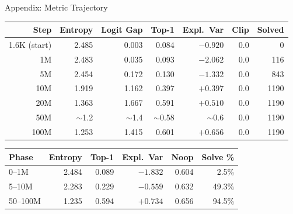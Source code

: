 \documentclass[aspectratio=169,11pt]{beamer}
\begin{document}
\begin{frame}{Appendix: Metric Trajectory}
  \scriptsize
  \begin{center}
  \begin{tabular}{rrrrrrr}
    \toprule
    \textbf{Step} & \textbf{Entropy} & \textbf{Logit Gap} & \textbf{Top-1} & \textbf{Expl.\ Var} & \textbf{Clip} & \textbf{Solved} \\
    \midrule
    1.6K (start) & 2.485 & 0.003 & 0.084 & $-0.920$ & 0.0 & 0 \\
    1M    & 2.483 & 0.035 & 0.093 & $-2.062$ & 0.0 & 116 \\
    5M    & 2.454 & 0.172 & 0.130 & $-1.332$ & 0.0 & 843 \\
    10M   & 1.919 & 1.162 & 0.397 & $+0.397$ & 0.0 & 1190 \\
    20M   & 1.363 & 1.667 & 0.591 & $+0.510$ & 0.0 & 1190 \\
    50M   & $\sim$1.2 & $\sim$1.4 & $\sim$0.58 & $\sim$0.6 & 0.0 & 1190 \\
    100M  & 1.253 & 1.415 & 0.601 & $+0.656$ & 0.0 & 1190 \\
    \bottomrule
  \end{tabular}
  \end{center}

  \bigskip
  \small
  \begin{center}
  \begin{tabular}{lrrrrr}
    \toprule
    \textbf{Phase} & \textbf{Entropy} & \textbf{Top-1} & \textbf{Expl.\ Var} & \textbf{Noop} & \textbf{Solve \%} \\
    \midrule
    0--1M    & 2.484 & 0.089 & $-1.832$ & 0.604 & 2.5\% \\
    5--10M   & 2.283 & 0.229 & $-0.559$ & 0.632 & 49.3\% \\
    50--100M & 1.235 & 0.594 & $+0.734$ & 0.656 & 94.5\% \\
    \bottomrule
  \end{tabular}
  \end{center}
\end{frame}
\end{document}
